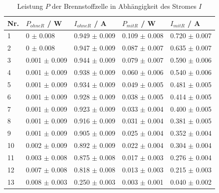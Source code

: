 \documentclass[12pt,a4paper,twoside]{article}
\begin{document}
\begin{table}[H]
    \centering
    \caption{Leistung $P$ der Brennstoffzelle in Abhängigkeit des Stromes $I$}
    \label{tab:Leistung Brennstoffzelle}
    \begin{tabular}{| l | l | l | l | l |}
        \hline
        Nr. & $P_{ohneR}$  / W & $I_{ohneR}$ / A & $P_{mitR}$ / W & $I_{mitR}$ / A \\
        \hline
        1   & 0       $\pm$ 0.008  & 0.949 $\pm$ 0.009 & 0.109   $\pm$ 0.008  & 0.720 $\pm$ 0.007 \\
        2   & 0       $\pm$ 0.008  & 0.947 $\pm$ 0.009 & 0.087   $\pm$ 0.007  & 0.635 $\pm$ 0.007 \\
        3   & 0.001   $\pm$ 0.009  & 0.944 $\pm$ 0.009 & 0.079   $\pm$ 0.007  & 0.590 $\pm$ 0.006 \\
        4   & 0.001   $\pm$ 0.009  & 0.938 $\pm$ 0.009 & 0.060   $\pm$ 0.006  & 0.540 $\pm$ 0.006 \\
        5   & 0.001   $\pm$ 0.009  & 0.934 $\pm$ 0.009 & 0.049   $\pm$ 0.005  & 0.481 $\pm$ 0.005 \\
        6   & 0.001   $\pm$ 0.009  & 0.928 $\pm$ 0.009 & 0.038   $\pm$ 0.005  & 0.414 $\pm$ 0.005 \\
        7   & 0.001   $\pm$ 0.009  & 0.923 $\pm$ 0.009 & 0.033   $\pm$ 0.004  & 0.400 $\pm$ 0.005 \\
        8   & 0.001   $\pm$ 0.009  & 0.916 $\pm$ 0.009 & 0.031   $\pm$ 0.004  & 0.381 $\pm$ 0.005 \\
        9   & 0.001   $\pm$ 0.009  & 0.905 $\pm$ 0.009 & 0.025   $\pm$ 0.004  & 0.352 $\pm$ 0.004 \\
        10  & 0.002   $\pm$ 0.009  & 0.892 $\pm$ 0.009 & 0.022   $\pm$ 0.004  & 0.304 $\pm$ 0.004 \\
        11  & 0.003   $\pm$ 0.008  & 0.875 $\pm$ 0.008 & 0.017   $\pm$ 0.003  & 0.276 $\pm$ 0.004 \\
        12  & 0.007   $\pm$ 0.008  & 0.818 $\pm$ 0.008 & 0.013   $\pm$ 0.003  & 0.215 $\pm$ 0.003 \\
        13  & 0.008   $\pm$ 0.003  & 0.250 $\pm$ 0.003 & 0.003   $\pm$ 0.001  & 0.040 $\pm$ 0.002 \\
        \hline  
    \end{tabular}
\end{table}
\end{document}
